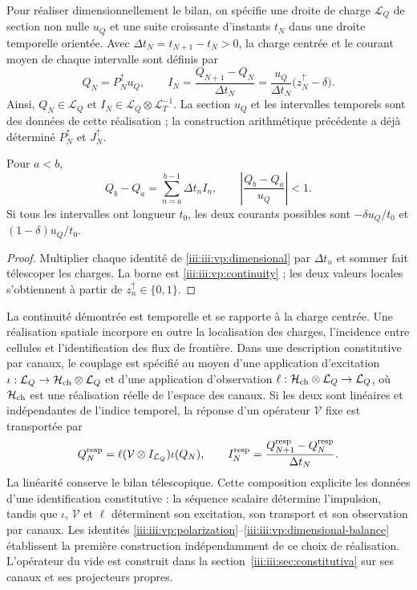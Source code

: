 Pour réaliser dimensionnellement le bilan, on spécifie une droite de charge
$\mathcal L_Q$ de section non nulle $u_Q$ et une suite croissante
d’instants $t_N$ dans une droite temporelle orientée. Avec
$\Delta t_N=t_{N+1}-t_N>0$, la charge centrée et le courant moyen de
chaque intervalle sont définis par
\begin{equation}
 Q_N=P_N^{\uparrow}u_Q,\qquad
 I_N=\frac{Q_{N+1}-Q_N}{\Delta t_N}
     =\frac{u_Q}{\Delta t_N}\bigl(z_N^{\uparrow}-\delta\bigr).
 \label{iii:iii:vp:dimensional}
\end{equation}
Ainsi, $Q_N\in\mathcal L_Q$ et $I_N\in\mathcal L_Q\otimes\mathcal L_T^{-1}$. La section $u_Q$ et les intervalles temporels sont des données de cette réalisation ; la construction arithmétique précédente a déjà déterminé $P_N^{\uparrow}$ et $J_N^{\uparrow}$.

\begin{proposition}
Pour $a<b$,
\begin{equation}
 Q_b-Q_a=\sum_{n=a}^{b-1}\Delta t_n I_n,
 \qquad
 \left|\frac{Q_b-Q_a}{u_Q}\right|<1.
 \label{iii:iii:vp:dimensional-balance}
\end{equation}
Si tous les intervalles ont longueur $t_0$, les deux courants possibles
sont $-\delta u_Q/t_0$ et $(1-\delta)u_Q/t_0$.
\end{proposition}
\begin{proof}
Multiplier chaque identité de \eqref{iii:iii:vp:dimensional} par
$\Delta t_n$ et sommer fait télescoper les charges. La borne est
\eqref{iii:iii:vp:continuity} ; les deux valeurs locales s’obtiennent à partir de
$z_n^{\uparrow}\in\{0,1\}$.
\end{proof}

La continuité démontrée est temporelle et se rapporte à la charge centrée. Une réalisation spatiale incorpore en outre la localisation des charges, l'incidence entre cellules et l'identification des flux de frontière. Dans une description constitutive par canaux, le couplage est spécifié au moyen d'une application d'excitation $\iota:\mathcal L_Q\to\mathcal H_{\rm ch}\otimes\mathcal L_Q$ et d'une application d'observation $\ell:\mathcal H_{\rm ch}\otimes\mathcal L_Q\to\mathcal L_Q$, où $\mathcal H_{\rm ch}$ est une réalisation réelle de l'espace des canaux. Si les deux sont linéaires et indépendantes de l'indice temporel, la réponse d'un opérateur $\mathcal V$ fixe est transportée par
\[
 Q_N^{\rm resp}=\ell(\mathcal V\otimes I_{\mathcal L_Q})\iota(Q_N),
 \qquad
 I_N^{\rm resp}=\frac{Q_{N+1}^{\rm resp}-Q_N^{\rm resp}}{\Delta t_N}.
\]
La linéarité conserve le bilan télescopique. Cette composition
explicite les données d’une identification constitutive : la séquence
scalaire détermine l’impulsion, tandis que $\iota$, $\mathcal V$ et $\ell$
déterminent son excitation, son transport et son observation par canaux. Les
identités \eqref{iii:iii:vp:polarization}--\eqref{iii:iii:vp:dimensional-balance}
établissent la première construction indépendamment de ce choix de
réalisation. L’opérateur du vide est construit dans la
section~\ref{iii:iii:sec:constitutiva} sur ses canaux et ses projecteurs propres.

